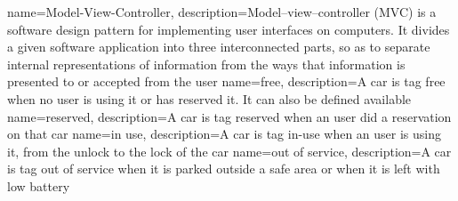 
{
  name={Model-View-Controller},
  description={Model–view–controller (MVC) is a software design pattern for implementing user interfaces on computers. It divides a given software application into three interconnected parts, so as to separate internal representations of information from the ways that information is presented to or accepted from the user}
}
{
	name={free},
	description={A car is tag free when no user is using it or has reserved it. It can also be defined available}
}
{
	name={reserved},
	description={A car is tag reserved when an user did a reservation on that car}
}
{
	name={in use},
	description={A car is tag in-use when an user is using it, from the unlock to the lock of the car}
}
{
	name={out of service},
	description={A car is tag out of service when it is parked outside a safe area or when it is left with low battery}
}

